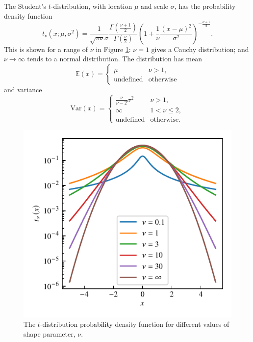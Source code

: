 \documentclass[fleqn,usenatbib]{rasti}
\begin{document}
The Student's $t$-distribution, with location $\mu$ and scale $\sigma$, has
the probability density function
\begin{equation}
    t_{\nu} \left(x; {\mu}, {\sigma^2}\right)
        =
    \frac{1}{\sqrt{\pi \nu} \sigma}
    \frac{
        \Gamma \left(\frac{\nu + 1}2\right)
    }{
        \Gamma \left(\frac{\nu}2\right)
    }
    \left(
        1 + \frac{1}{\nu} \frac{\left(x - \mu\right)^2}{\sigma^2}
    \right)^{
        -\frac{\nu + 1}{2}
    }.
\end{equation}
This is shown for a range of $\nu$ in Figure \ref{fig:model.t}: $\nu
= 1$ gives a Cauchy distribution; and $\nu \rightarrow \infty$ tends to a normal
distribution. The distribution has mean
\begin{equation}
    \mathbb{E}(x)
        =
    \begin{cases}
        \mu & \nu > 1, \\
        \textrm{undefined} & \textrm{otherwise}
    \end{cases}
\end{equation}
and variance
\begin{equation}
    \mathrm{Var}(x)
        =
    \begin{cases}
        \frac{\nu}{\nu - 2} \sigma^2 & \nu > 1, \\
        \infty & 1 < \nu \leq 2, \\
        \textrm{undefined} & \textrm{otherwise.}
    \end{cases}
\end{equation}

\begin{figure}
	\includegraphics{graphics/t-dist-log.pdf}
    \caption{The $t$-distribution probability density function for different
    values of shape parameter, $\nu$.}
    \label{fig:model.t}
\end{figure}
\end{document}
